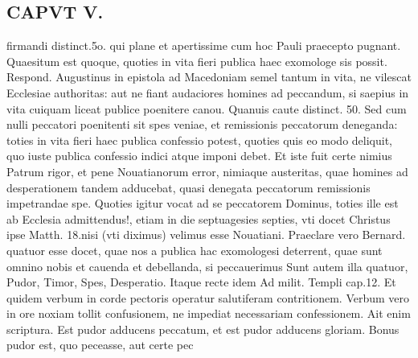 \documentclass{article}
\begin{document}
\begin{pages}
\section*{CAPVT  V. }\pstart firmandi distinct.5o. qui plane et apertissime cum hoc Pauli praecepto pugnant. Quaesitum est quoque, quoties in vita fieri publica haec exomologe sis possit. Respond. Augustinus in epistola ad Macedoniam semel tantum in vita, ne vilescat Ecclesiae authoritas: aut ne fiant audaciores homines ad peccandum, si saepius in vita cuiquam liceat publice poenitere canou. Quanuis caute distinct. 50. Sed cum nulli peccatori poenitenti sit spes veniae, et remissionis peccatorum deneganda: toties in vita fieri haec publica confessio potest, quoties quis eo modo deliquit, quo iuste publica confessio indici atque imponi debet. Et iste fuit certe nimius Patrum rigor, et pene Nouatianorum error, nimiaque austeritas, quae homines ad desperationem tandem adducebat, quasi denegata peccatorum remissionis impetrandae spe. Quoties igitur vocat ad se peccatorem Dominus, toties ille est ab Ecclesia admittendus!, etiam in die septuagesies septies, vti docet Christus ipse Matth. 18.nisi (vti diximus) velimus esse Nouatiani. Praeclare vero Bernard. quatuor esse docet, quae nos a publica hac exomologesi deterrent, quae sunt omnino nobis et cauenda et debellanda, si peccauerimus Sunt autem illa quatuor, Pudor, Timor, Spes, Desperatio. Itaque recte idem Ad milit. Templi cap.12. Et quidem verbum in corde pectoris operatur salutiferam contritionem. Verbum vero in ore noxiam tollit confusionem, ne impediat necessariam confessionem. Ait enim scriptura. Est pudor adducens peccatum, et est pudor adducens gloriam. Bonus pudor est, quo peceasse, aut certe pec\pend

\end{pages}
\end{document}
